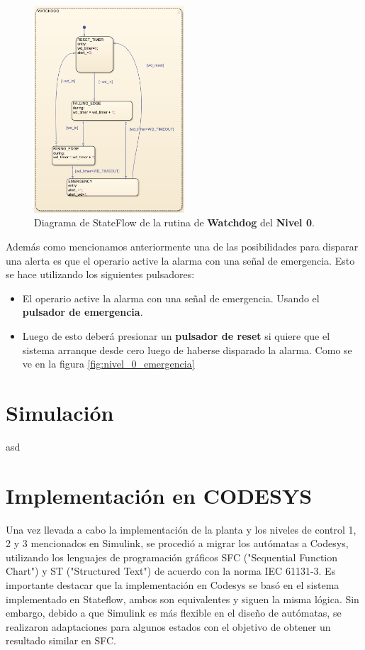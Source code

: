 \documentclass[11pt]{article}
\begin{document}
\begin{figure}[!h]
	\centering
	\includegraphics[width=0.5\textwidth]{images/imagen_28_watchdog.png}
	\caption{Diagrama de StateFlow de la rutina de \textbf{Watchdog} del \textbf{Nivel 0}.}
	\label{fig:nivel_0_watchdog}
\end{figure}

\newpage

Además como mencionamos anteriormente una de las posibilidades para disparar una alerta es que el operario active la alarma con una señal de emergencia. Esto se hace utilizando los siguientes pulsadores:
\begin{itemize}
	\item El operario active la alarma con una señal de emergencia. Usando el \textbf{pulsador de emergencia}.
	\item Luego de esto deberá presionar un \textbf{pulsador de reset} si quiere que el sistema arranque desde cero luego de haberse disparado la alarma. Como se ve en la figura \ref{fig:nivel_0_emergencia}
\end{itemize}

  


\section{Simulación}
asd

\section{Implementación en CODESYS}

Una vez llevada a cabo la implementación de la planta y los niveles de control 1, 2 y 3 mencionados en Simulink, se procedió a migrar los autómatas a Codesys, utilizando los lenguajes de programación gráficos SFC ("Sequential Function Chart") y ST ("Structured Text") de acuerdo con la norma IEC 61131-3. Es importante destacar que la implementación en Codesys se basó en el sistema implementado en Stateflow, ambos son equivalentes y siguen la misma lógica. Sin embargo, debido a que Simulink es más flexible en el diseño de autómatas, se realizaron adaptaciones para algunos estados con el objetivo de obtener un resultado similar en SFC.
\end{document}
